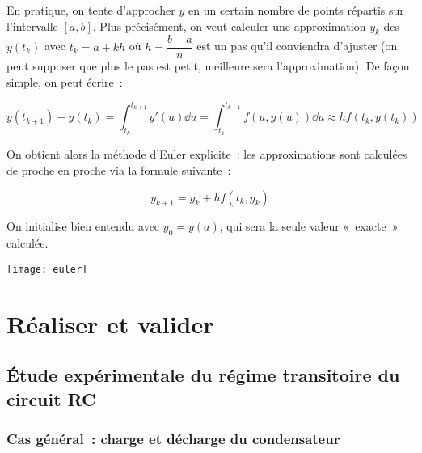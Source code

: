 \documentclass[a4paper, 11pt, final, garamond]{book}
\begin{document}
En pratique, on tente d'approcher $y$ en un certain nombre de points répartis
sur l'intervalle $[a,b]$. Plus précisément, on veut calculer une approximation
$y_k$ des $y(t_k)$ avec $t_k=a+kh$ où $h=\dfrac{b-a}{n}$ est un pas qu'il
conviendra d'ajuster (on peut supposer que plus le pas est petit, meilleure sera
l'approximation). De façon simple, on peut écrire~:

\[y(t_{k+1})-y(t_k) =
    \int_{t_k}^{t_{k+1}}y'(u) \dd u =
    \int_{t_k}^{t_{k+1}} f(u,y(u)) \dd u \approx
h f(t_k,y(t_k))\]

On obtient alors la méthode d'Euler explicite~: les approximations sont
calculées de proche en proche via la formule suivante~:

$$y_{k+1}=y_k+hf(t_k,y_k)$$

On initialise bien entendu avec $y_0=y(a)$, qui sera la seule valeur «~exacte~»
calculée.

\begin{center}
    \texttt{[image: euler]}
\end{center}

\section{Réaliser et valider}

\subsection{Étude expérimentale du régime transitoire du circuit RC}

\subsubsection{Cas général~: charge et décharge du condensateur}
\end{document}
